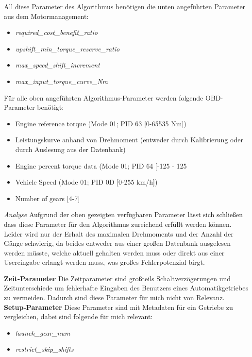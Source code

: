 	All diese Parameter des Algorithmus benötigen die unten angeführten Parameter aus dem Motormanagement:
	\begin{itemize}
		\item \textit{required_cost_benefit_ratio}
		\cite{Represents the minimum benefit that must be available before a cost based shift will be allowed.}
		\item \textit{upshift_min_torque_reserve_ratio}
		\cite{Specifies the amount of headroom, in terms of full torque, [...] to prevent upshifting too close to full load in a higher gear.}
		\item \textit{max_speed_shift_increment}
		\cite{Determines the number of gears to shift by when upshifting at max_speed_radps. Typically one, though especially for larger amout of gears availible also often 2.}
		\item \textit{max_input_torque_curve_Nm}
		\cite{Used to specify the powertrain torque availible.}
	\end{itemize}
	Für alle oben angeführten Algorithmus-Parameter werden folgende OBD-Parameter benötigt:
	\begin{itemize}
		\item Engine reference torque (Mode 01; PID 63 [0-65535 Nm])
		\item Leistungskurve anhand von Drehmoment (entweder durch Kalibrierung oder durch Auslesung aus der Datenbank)
		\item Engine percent torque data (Mode 01; PID 64 [-125 - 125 %
		\item Vehicle Speed (Mode 01; PID 0D [0-255 km/h])
		\item Number of gears [4-7]
	\end{itemize}

	\textit{Analyse}
	Aufgrund der oben gezeigten verfügbaren Parameter lässt sich schließen dass diese Parameter für den Algorithmus zureichend erfüllt werden können. Leider wird nur der Erhalt des maximalen Drehmoments und der Anzahl der Gänge schwierig, da beides entweder aus einer großen Datenbank ausgelesen werden müsste, welche aktuell gehalten werden muss oder direkt aus einer Usereingabe erlangt werden muss, was großes Fehlerpotenzial birgt. 

	\textbf{Zeit-Parameter}
	Die Zeitparameter sind großteils Schaltverzögerungen und Zeitunterschiede um fehlerhafte Eingaben des Benutzers eines Automatikgetriebes zu vermeiden. Dadurch sind diese Parameter für mich nicht von Relevanz.
	\textbf{Setup-Parameter}
	Diese Parameter sind mit Metadaten für ein Getriebe zu vergleichen, dabei sind folgende für mich relevant:
	\begin{itemize}
		\item \textit{launch_gear_num}
		\cite{Specifies the normal gear to use when launching from zero speed.}
		\item \textit{restrict_skip_shifts}
		\cite{If set to 'true' forces shifts to be sequential, [...] typically true for transmissions with less than 7 gears.}
	\end{itemize}

